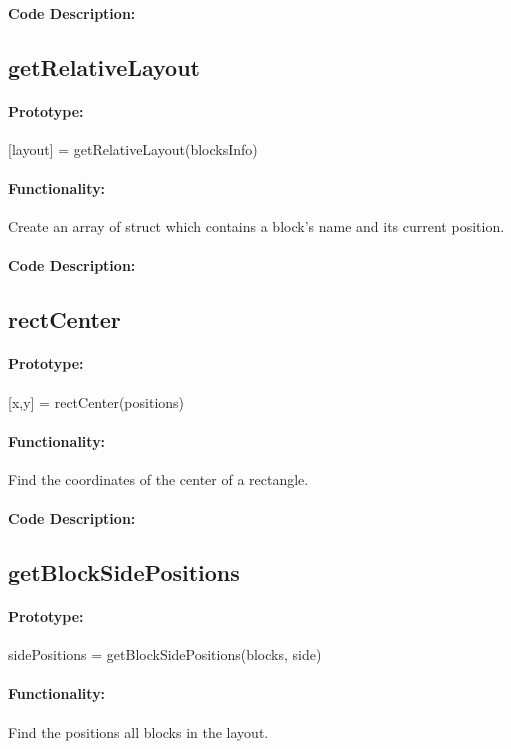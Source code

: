 \documentclass[12pt,letterpaper]{report}
\begin{document}
\paragraph{Code Description:}

\subsection{getRelativeLayout}
\paragraph{Prototype:} [layout] = getRelativeLayout(blocksInfo)
\paragraph{Functionality:} Create an array of struct which contains a block's name and its current position.
\paragraph{Code Description:}

\subsection{rectCenter}
\paragraph{Prototype:} [x,y] = rectCenter(positions)
\paragraph{Functionality:} Find the coordinates of the center of a rectangle.
\paragraph{Code Description:}

\subsection{getBlockSidePositions}
\paragraph{Prototype:} sidePositions = getBlockSidePositions(blocks, side)
\paragraph{Functionality:} Find the positions all blocks in the layout.
\end{document}
